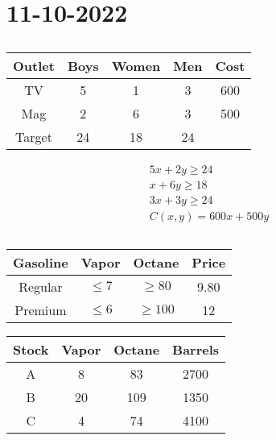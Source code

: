 \chapter{11-10-2022}

\section{}

\begin{center}
    \begin{tabular}{||c c c c c||}
        \hline
        Outlet & Boys & Women & Men & Cost \\
        \hline
        \hline
        TV & 5 & 1 & 3 & 600 \\
        \hline
        Mag & 2 & 6 & 3 & 500 \\
        \hline
        Target & 24 & 18 & 24 & \\
        \hline
    \end{tabular}
\end{center}

\begin{align}
    \text{$5x + 2y \geq 24$} \\
    \text{$x + 6y \geq 18$} \\
    \text{$3x + 3y \geq 24$} \\
    \text{$C(x,y) = 600x + 500y$}
\end{align}

\section{}

\begin{center}
    \begin{tabular}{||c c c c||}
        \hline
        Gasoline & Vapor & Octane & Price \\
        \hline
        \hline
        Regular & $\leq 7$ & $\geq 80$ & 9.80 \\
        \hline
        Premium & $\leq 6$ & $\geq 100$ & 12 \\
        \hline
    \end{tabular}
\end{center}

\begin{center}
    \begin{tabular}{||c c c c||}
        \hline
        Stock & Vapor & Octane & Barrels \\
        \hline
        \hline
        A & 8 & 83 & 2700 \\
        \hline
        B & 20 & 109 & 1350 \\
        \hline
        C & 4 & 74 & 4100 \\
        \hline
    \end{tabular}
\end{center}

